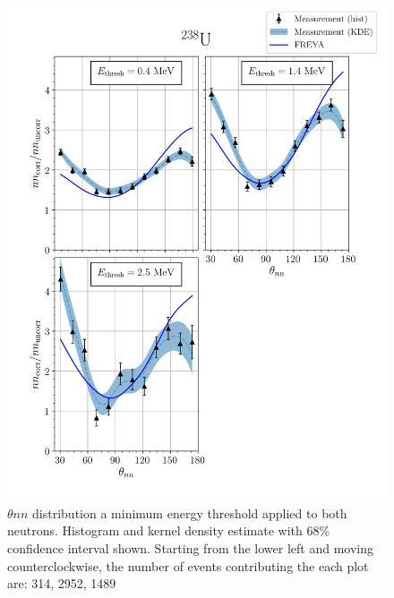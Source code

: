 \FloatBarrier
\begin{figure}
\centering
    \includegraphics[width = 1.1\textwidth]{Content/Results/FinalDUResultw_freya0KDE.png}
    \caption{$\theta{nn}$ distribution  a minimum energy threshold applied to both neutrons.
    Histogram and kernel density estimate with 68\% confidence interval shown.
    Starting from the lower left and moving counterclockwise, the number of events contributing the each plot are: 314, 2952, 1489 }
    \label{fig:DU(0)}
\end{figure}
